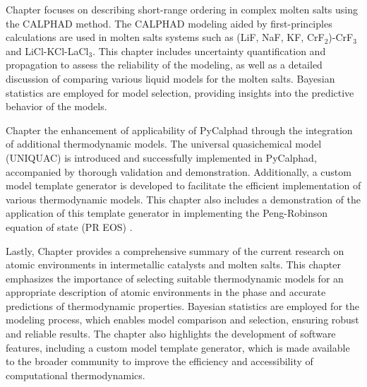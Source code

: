 Chapter  focuses on describing short-range ordering in complex molten salts using the CALPHAD method. The CALPHAD modeling aided by first-principles calculations are used in molten salts systems such as (LiF, NaF, KF, CrF$_2$)-CrF$_3$ and LiCl-KCl-LaCl$_3$. This chapter includes uncertainty quantification and propagation to assess the reliability of the modeling, as well as a detailed discussion of comparing various liquid models for the molten salts. Bayesian statistics are employed for model selection, providing insights into the predictive behavior of the models.

Chapter  the enhancement of applicability of PyCalphad through the integration of additional thermodynamic models. The universal quasichemical model (UNIQUAC) \cite{abrams1975statistical} is introduced and successfully implemented in PyCalphad, accompanied by thorough validation and demonstration. Additionally, a custom model template generator is developed to facilitate the efficient implementation of various thermodynamic models. This chapter also includes a demonstration of the application of this template generator in implementing the Peng-Robinson equation of state (PR EOS) \cite{peng1976new}.

Lastly, Chapter  provides a comprehensive summary of the current research on atomic environments in intermetallic catalysts and molten salts. This chapter emphasizes the importance of selecting suitable thermodynamic models for an appropriate description of atomic environments in the phase and accurate predictions of thermodynamic properties. Bayesian statistics are employed for the modeling process, which enables model comparison and selection, ensuring robust and reliable results. The chapter also highlights the development of software features, including a custom model template generator, which is made available to the broader community to improve the efficiency and accessibility of computational thermodynamics.